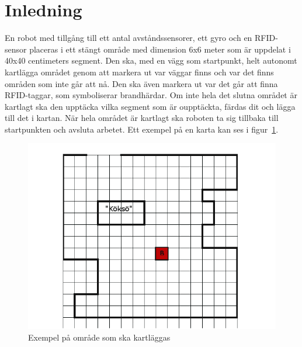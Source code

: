\documentclass[a4paper,12pt,fleqn]{article}
\begin{document}
\addto\captionsswedish{\renewcommand{\contentsname}{Innehållsförteckning}}

\tableofcontents
\thispagestyle{fancy}
\newpage


\section{Inledning}

En robot med tillgång till ett antal avståndssensorer, ett gyro och en RFID-sensor placeras i ett stängt område med dimension 6x6 meter som är uppdelat i 40x40 centimeters segment. 
Den ska, med en vägg som startpunkt, helt autonomt kartlägga området genom att markera ut var väggar finns och var det finns områden som inte går att nå. 
Den ska även markera ut var det går att finna RFID-taggar, som symboliserar brandhärdar. 
Om inte hela det slutna området är kartlagt ska den upptäcka vilka segment som är oupptäckta, färdas dit och lägga till det i kartan. 
När hela området är kartlagt ska roboten ta sig tillbaka till startpunkten och avsluta arbetet. Ett exempel på en karta kan ses i figur~\ref{fig:omrade}.
\begin{figure}[htp] %
  \begin{center}
  \includegraphics[keepaspectratio=true,scale=0.5]{gimpmap.png}  %
  \end{center}
  \caption{Exempel på område som ska kartläggas} %
  \label{fig:omrade}
\end{figure}
\end{document}
